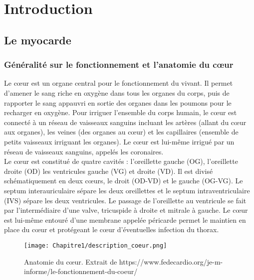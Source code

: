 \chapter{Introduction}
\label{chap:intro}

\minitoc
\section{Le myocarde}


\subsection{Généralité sur le fonctionnement et l'anatomie du cœur }

Le cœur est un organe central pour le fonctionnement du vivant. Il permet d’amener le sang riche en oxygène dans tous les organes
 du corps, puis de rapporter le sang appauvri en sortie des organes dans les poumons pour le recharger en oxygène.
  Pour irriguer l’ensemble du corps humain, le cœur est connecté à un réseau de vaisseaux sanguins incluant les artères 
  (allant du cœur aux organes), les veines (des organes au cœur) et les capillaires (ensemble de petits vaisseaux irriguant
   les organes). Le cœur est lui-même irrigué par un réseau de vaisseaux sanguins, appelés les coronaires. \\


Le cœur est constitué de quatre cavités : l’oreillette gauche (OG), l’oreillette droite (OD) les ventricules gauche (VG) et
 droite (VD). Il est divisé schématiquement en deux cœurs, le droit (OD-VD) et le gauche (OG-VG). 
 Le septum interauriculaire sépare les deux oreillettes et le septum intraventriculaire (IVS) 
 sépare les deux ventricules. Le passage de l’oreillette au ventricule se fait par l’intermédiaire d’une valve, 
 tricuspide à droite et mitrale à gauche. Le cœur est lui-même entouré d’une membrane appelée péricarde permet le maintien
  en place du cœur et protégeant le cœur d’éventuelles infection du thorax.

\begin{figure}[!htbp]
  \begin{center}
    \texttt{[image: Chapitre1/description\_coeur.png]}
  \end{center}
  \caption{Anatomie du cœur. Extrait de https://www.fedecardio.org/je-m-informe/le-fonctionnement-du-coeur/}
  \label{fig:description_coeur}
\end{figure}

